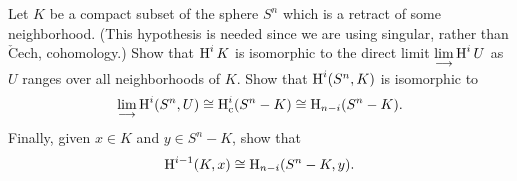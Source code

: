 \documentclass[../main]{subfiles}
\begin{document}
\begin{problem}\label{prob:A.2}
Let $K$ be a compact subset of the sphere $S^{n}$ which is a retract of some neighborhood. (This hypothesis is needed since we are using singular, rather than $\check{\text{C}}$ech, cohomology.) Show that $\operatorname{H}^{i} K$ is isomorphic to the direct limit $\displaystyle\lim_{\longrightarrow} \operatorname{H}^{i} U$ as $U$ ranges over all neighborhoods of $K$. Show that $\operatorname{H}^{i}(S^{n}, K)$ is isomorphic to
\[
\lim _{\longrightarrow} \operatorname{H}^{i}(S^{n}, U) \cong \operatorname{H}_{\text{c}}^{i}(S^{n}-K) \cong \operatorname{H}_{n-i}(S^{n}-K).
\]
Finally, given $x \in K$ and $y \in S^{n}-K$, show that
\[
\operatorname{H}^{i-1}(K, x) \cong \operatorname{H}_{n-i}(S^{n}-K, y).
\]

\end{problem}
\end{document}
